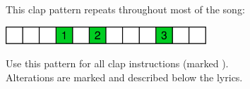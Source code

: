 \def\songtitle{"MY LIST" to you!}
\def\songcomment{}
\def\songlyrics{Aki Hata}
\def\songwriter{Hara Tomoya}
\def\songarrange{Ramseeni}
   
\ifdefined\COMPLETE
\else
	
	
\fi
\thispagestyle{song}

{\small
	This clap pattern repeats throughout most of the song:\\
	\centerline{\includegraphics[height=0.66cm,keepaspectratio]{images/mylist_clappattern_default.pdf}}
	Use this pattern for all clap instructions (marked ).\\
	Alterations are marked  and described below the lyrics.
}

